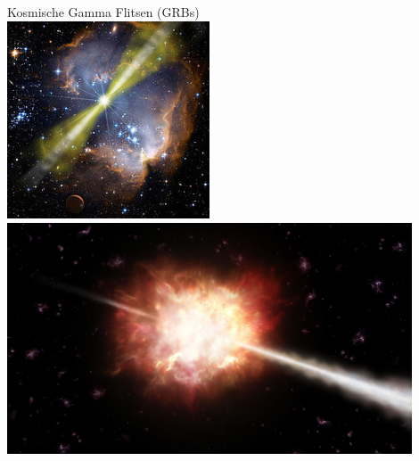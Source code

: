 \newpage

\begin{center}
{\blue Kosmische Gamma Flitsen (GRBs)}\\[1cm]
\includegraphics[keepaspectratio,width=6cm]{grb}\\[3mm]
\includegraphics[keepaspectratio,width=12cm]{grb2}
\end{center}

